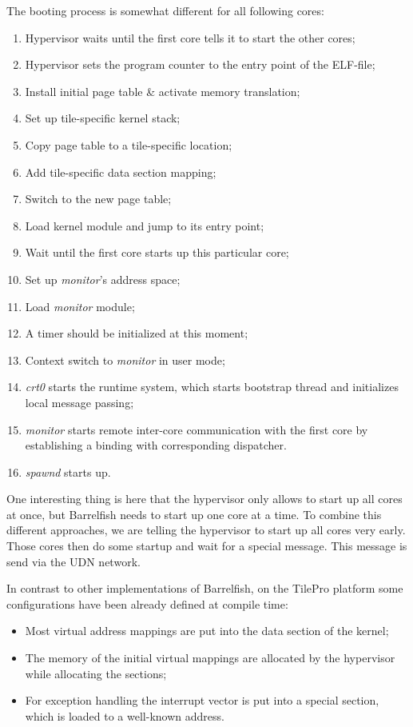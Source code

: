\documentclass[a4paper,twoside]{report} %
\begin{document}
The booting process is somewhat different for all following cores:
\begin{enumerate}
  \item Hypervisor waits until the first core tells it to start the other cores;
  \item Hypervisor sets the program counter to the entry point of the ELF-file;
  \item Install initial page table \& activate memory translation;
  \item Set up tile-specific kernel stack;
  \item Copy page table to a tile-specific location;
  \item Add tile-specific data section mapping;
  \item Switch to the new page table;
  \item Load kernel module and jump to its entry point;
  \item Wait until the first core starts up this particular core;	
  \item Set up \emph{monitor}'s address space;
  \item Load \emph{monitor} module;
  \item A timer should be initialized at this moment;
  \item Context switch to \emph{monitor} in user mode;
  \item \emph{crt0} starts the runtime system, which starts bootstrap thread and initializes local message passing;
  \item \emph{monitor} starts remote inter-core communication with the first core by establishing a binding with corresponding dispatcher.
  \item \emph{spawnd} starts up.
\end{enumerate}

One interesting thing is here that the hypervisor only allows to start up all cores at once, but Barrelfish needs to start up one core at a time. To combine this different approaches, we are telling the hypervisor to start up all cores very early. Those cores then do some startup and wait for a special message. This message is send via the UDN network.

In contrast to other implementations of Barrelfish, on the TilePro platform some configurations have been already defined at compile time:
\begin{itemize}
  \item Most virtual address mappings are put into the data section of the kernel;
  \item The memory of the initial virtual mappings are allocated by the hypervisor while allocating the sections;
  \item For exception handling the interrupt vector is put into a special section, which is loaded to a well-known address.
\end{itemize}
\end{document}
